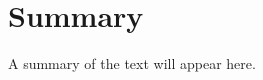 \documentclass[main]{subfiles}
\begin{document}
\chapter*{Summary}\label{ch:summary}

A summary of the text will appear here.
\end{document}
